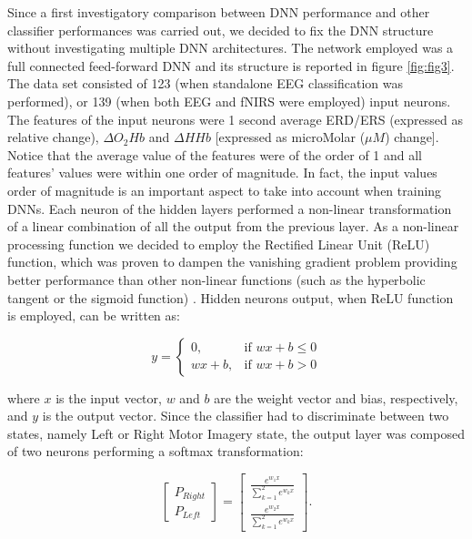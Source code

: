 \documentclass[12pt]{iopart}
\begin{document}
Since  a first investigatory comparison between DNN performance and other classifier performances was carried out, we decided to fix the DNN structure without investigating multiple DNN architectures.
The network employed was a full connected feed-forward DNN and its structure is reported in figure \ref{fig:fig3}.
The data set consisted of 123 (when standalone EEG classification was performed), or 139 (when both EEG and fNIRS were employed) input neurons. 
The features of the input neurons were 1 second average ERD/ERS (expressed as relative change), $\Delta O_{2}Hb$ and $\Delta HHb$ [expressed as microMolar ($\mu M$) change]. Notice that the average value of the features were of the order of 1 and all features' values were within one order of magnitude. In fact, the input values order of magnitude is an important aspect to take into account when training DNNs.
Each neuron of the hidden layers performed a non-linear transformation of a linear combination of all the output from the previous layer. As a non-linear processing function we decided to employ the Rectified Linear Unit (ReLU) function, which was proven to dampen the vanishing gradient problem providing better performance than other non-linear functions (such as the hyperbolic tangent or the sigmoid function) \parencite{dahl2013improving}. Hidden neurons output,  when ReLU function is employed, can be written as:

\begin{equation}
y=
\begin{cases}
0,& \text{if } wx+b \leq 0\\
wx+b,&\text{if } wx+b > 0
\end{cases}
\end{equation}

where $x$ is the input vector, $w$ and $b$ are the weight vector and bias, respectively, and $y$ is the output vector.
Since the classifier had to discriminate between two states, namely Left or Right Motor Imagery state, the output layer was composed of two neurons performing a softmax transformation:

\begin{equation}
\begin{bmatrix}
P_{Right}\\
P_{Left}
\end{bmatrix}
=
\begin{bmatrix}
\frac{e^{w_1x}}{\sum\limits_{k=1}^2 e^{w_kx}}\\
\frac{e^{w_2x}}{\sum\limits_{k=1}^2 e^{w_kx}}
\end{bmatrix}
.
\end{equation}
\end{document}
